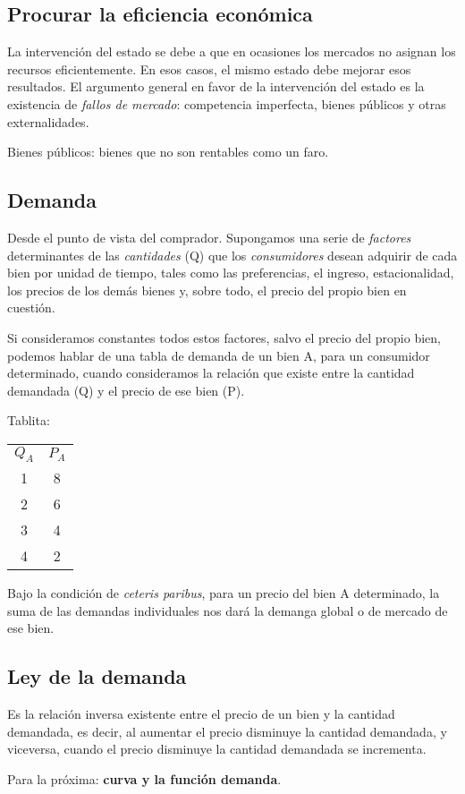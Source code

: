 \subsection{Procurar la eficiencia económica}

La intervención del estado se debe a que en ocasiones los mercados no asignan los recursos eficientemente.
En esos casos, el mismo estado debe mejorar esos resultados.
El argumento general en favor de la intervención del estado es la existencia de \textit{fallos de mercado}:
competencia imperfecta, bienes públicos y otras externalidades.

Bienes públicos: bienes que no son rentables como un faro.

\subsection{Demanda}

Desde el punto de vista del comprador.
Supongamos una serie de \textit{factores} determinantes de las \textit{cantidades} (Q)
que los \textit{consumidores} desean adquirir de cada bien por unidad de tiempo,
tales como las preferencias, el ingreso, 
estacionalidad, los precios de los demás bienes y, sobre todo,
el precio del propio bien en cuestión.

Si consideramos constantes todos estos factores, salvo el precio del propio bien,
podemos hablar de una tabla de demanda de un bien A,
para un consumidor determinado,
cuando consideramos la relación que existe entre la cantidad demandada (Q)
y el precio de ese bien (P).

Tablita:

\begin{tabular}{ c c }
    \(Q_A\) & \(P_A\) \\
    1& 8 \\
    2& 6 \\
    3& 4 \\
    4& 2 \\
\end{tabular}

Bajo la condición de \textit{ceteris paribus},
para un precio del bien A determinado,
la suma de las demandas individuales nos dará la demanga global o de mercado de ese bien.

\subsection{Ley de la demanda}

Es la relación inversa existente entre el precio de un bien y la cantidad demandada,
es decir, al aumentar el precio disminuye la cantidad demandada, y viceversa,
cuando el precio disminuye la cantidad demandada se incrementa.

Para la próxima: \textbf{curva y la función demanda}.